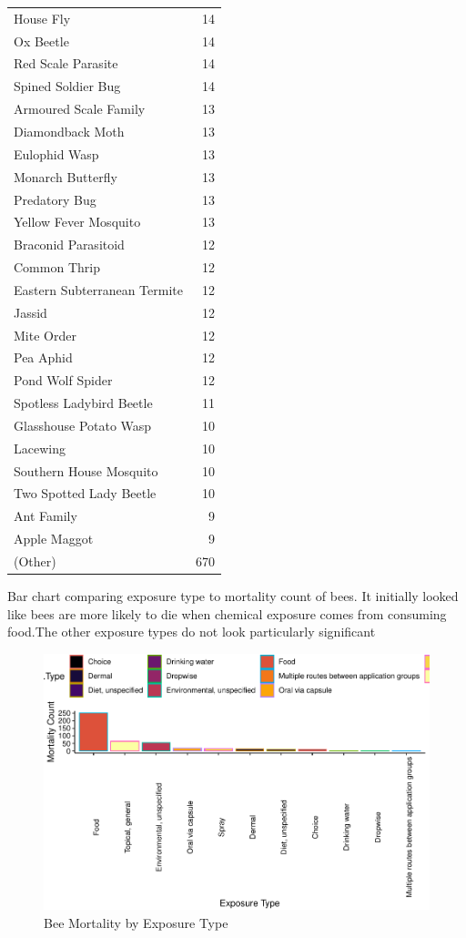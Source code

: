 \documentclass[
  12pt,
]{article}
\begin{document}
\begin{longtable}[]{@{}lr@{}}
House Fly & 14 \\
Ox Beetle & 14 \\
Red Scale Parasite & 14 \\
Spined Soldier Bug & 14 \\
Armoured Scale Family & 13 \\
Diamondback Moth & 13 \\
Eulophid Wasp & 13 \\
Monarch Butterfly & 13 \\
Predatory Bug & 13 \\
Yellow Fever Mosquito & 13 \\
Braconid Parasitoid & 12 \\
Common Thrip & 12 \\
Eastern Subterranean Termite & 12 \\
Jassid & 12 \\
Mite Order & 12 \\
Pea Aphid & 12 \\
Pond Wolf Spider & 12 \\
Spotless Ladybird Beetle & 11 \\
Glasshouse Potato Wasp & 10 \\
Lacewing & 10 \\
Southern House Mosquito & 10 \\
Two Spotted Lady Beetle & 10 \\
Ant Family & 9 \\
Apple Maggot & 9 \\
(Other) & 670 \\
\bottomrule
\end{longtable}

\newpage

Bar chart comparing exposure type to mortality count of bees. It
initially looked like bees are more likely to die when chemical exposure
comes from consuming food.The other exposure types do not look
particularly significant

\begin{figure}
\centering
\includegraphics{UpdatedwithModel_files/figure-latex/bee exposure-1.pdf}
\caption{Bee Mortality by Exposure Type}
\end{figure}
\end{document}

